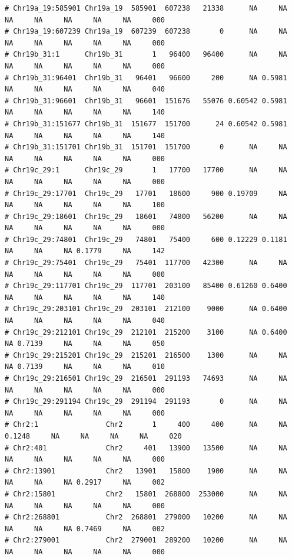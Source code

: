 \documentclass{article}\usepackage[]{graphicx}\usepackage[]{color}
\makeatletter
\newenvironment{kframe}{%
 \def\at@end@of@kframe{}%
 \ifinner\ifhmode%
  \def\at@end@of@kframe{\end{minipage}}%
  \begin{minipage}{\columnwidth}%
 \fi\fi%
 \def\FrameCommand##1{\hskip\@totalleftmargin \hskip-\fboxsep
 \colorbox{shadecolor}{##1}\hskip-\fboxsep
     \hskip-\linewidth \hskip-\@totalleftmargin \hskip\columnwidth}%
 \MakeFramed {\advance\hsize-\width
   \@totalleftmargin\z@ \linewidth\hsize
   \@setminipage}}%
 {\par\unskip\endMakeFramed%
 \at@end@of@kframe}
\newenvironment{knitrout}{}{} %
\makeatother
\begin{document}
\begin{knitrout}
\begin{kframe}
\begin{verbatim}
# Chr19a_19:585901 Chr19a_19  585901  607238   21338      NA     NA     NA     NA     NA     NA     NA     000
# Chr19a_19:607239 Chr19a_19  607239  607238       0      NA     NA     NA     NA     NA     NA     NA     000
# Chr19b_31:1      Chr19b_31       1   96400   96400      NA     NA     NA     NA     NA     NA     NA     000
# Chr19b_31:96401  Chr19b_31   96401   96600     200      NA 0.5981     NA     NA     NA     NA     NA     040
# Chr19b_31:96601  Chr19b_31   96601  151676   55076 0.60542 0.5981     NA     NA     NA     NA     NA     140
# Chr19b_31:151677 Chr19b_31  151677  151700      24 0.60542 0.5981     NA     NA     NA     NA     NA     140
# Chr19b_31:151701 Chr19b_31  151701  151700       0      NA     NA     NA     NA     NA     NA     NA     000
# Chr19c_29:1      Chr19c_29       1   17700   17700      NA     NA     NA     NA     NA     NA     NA     000
# Chr19c_29:17701  Chr19c_29   17701   18600     900 0.19709     NA     NA     NA     NA     NA     NA     100
# Chr19c_29:18601  Chr19c_29   18601   74800   56200      NA     NA     NA     NA     NA     NA     NA     000
# Chr19c_29:74801  Chr19c_29   74801   75400     600 0.12229 0.1181     NA     NA     NA 0.1779     NA     142
# Chr19c_29:75401  Chr19c_29   75401  117700   42300      NA     NA     NA     NA     NA     NA     NA     000
# Chr19c_29:117701 Chr19c_29  117701  203100   85400 0.61260 0.6400     NA     NA     NA     NA     NA     140
# Chr19c_29:203101 Chr19c_29  203101  212100    9000      NA 0.6400     NA     NA     NA     NA     NA     040
# Chr19c_29:212101 Chr19c_29  212101  215200    3100      NA 0.6400     NA 0.7139     NA     NA     NA     050
# Chr19c_29:215201 Chr19c_29  215201  216500    1300      NA     NA     NA 0.7139     NA     NA     NA     010
# Chr19c_29:216501 Chr19c_29  216501  291193   74693      NA     NA     NA     NA     NA     NA     NA     000
# Chr19c_29:291194 Chr19c_29  291194  291193       0      NA     NA     NA     NA     NA     NA     NA     000
# Chr2:1                Chr2       1     400     400      NA     NA 0.1248     NA     NA     NA     NA     020
# Chr2:401              Chr2     401   13900   13500      NA     NA     NA     NA     NA     NA     NA     000
# Chr2:13901            Chr2   13901   15800    1900      NA     NA     NA     NA     NA 0.2917     NA     002
# Chr2:15801            Chr2   15801  268800  253000      NA     NA     NA     NA     NA     NA     NA     000
# Chr2:268801           Chr2  268801  279000   10200      NA     NA     NA     NA     NA 0.7469     NA     002
# Chr2:279001           Chr2  279001  289200   10200      NA     NA     NA     NA     NA     NA     NA     000

\end{verbatim}
\end{kframe}
\end{knitrout}
\end{document}
